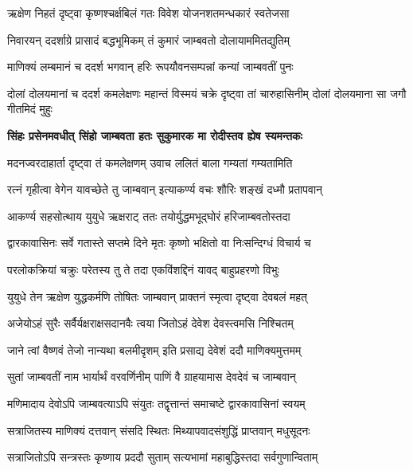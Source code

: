 \begin{center}
\twolineshloka
{ऋक्षेण निहतं दृष्ट्वा कृष्णश्चर्क्षबिलं गतः}
{विवेश योजनशतमन्धकारं स्वतेजसा}%

\twolineshloka
{निवारयन् ददर्शाग्रे प्रासादं बद्धभूमिकम्}
{तं कुमारं जाम्बवतो दोलायाममितद्युतिम्}%

\twolineshloka
{माणिक्यं लम्बमानं च ददर्श भगवान् हरिः}
{रूपयौवनसम्पन्नां कन्यां जाम्बवतीं पुनः}%

\threelineshloka
{दोलां दोलयमानां च ददर्श कमलेक्षणः}
{महान्तं विस्मयं चक्रे दृष्ट्वा तां चारुहासिनीम्}
{दोलां दोलयमाना सा जगौ गीतमिदं मुहुः}%

\begingroup
\bfseries
\twolineshloka
{सिंहः प्रसेनमवधीत् सिंहो जाम्बवता हतः}
{सुकुमारक मा रोदीस्तव ह्येष स्यमन्तकः}%
\endgroup

\twolineshloka
{मदनज्वरदाहार्ता दृष्ट्वा तं कमलेक्षणम्}
{उवाच ललितं बाला गम्यतां गम्यतामिति}%

\twolineshloka
{रत्नं गृहीत्वा वेगेन यावच्छेते तु जाम्बवान्}
{इत्याकर्ण्य वचः शौरिः शङ्खं दध्मौ प्रतापवान्}%

\twolineshloka
{आकर्ण्य सहसोत्थाय युयुधे ऋक्षराट् ततः}
{तयोर्युद्धमभूद्घोरं हरिजाम्बवतोस्तदा}%

\twolineshloka
{द्वारकावासिनः सर्वे गतास्ते सप्तमे दिने}
{मृतः कृष्णो भक्षितो वा निःसन्दिग्धं विचार्य च}%

\twolineshloka
{परलोकक्रियां चक्रुः परेतस्य तु ते तदा}
{एकविंशद्दिनं यावद् बाहुप्रहरणो विभुः}%

\twolineshloka
{युयुधे तेन ऋक्षेण युद्धकर्मणि तोषितः}
{जाम्बवान् प्राक्तनं स्मृत्वा दृष्ट्वा देवबलं महत्}%


\twolineshloka
{अजेयोऽहं सुरैः सर्वैर्यक्षराक्षसदानवैः}
{त्वया जितोऽहं देवेश देवस्त्वमसि निश्चितम्}%

\twolineshloka
{जाने त्वां वैष्णवं तेजो नान्यथा बलमीदृशम्}
{इति प्रसाद्य देवेशं ददौ माणिक्यमुत्तमम्}%

\twolineshloka
{सुतां जाम्बवतीं नाम भार्यार्थं वरवर्णिनीम्}
{पाणिं वै ग्राहयामास देवदेवं च जाम्बवान्}%

\twolineshloka
{मणिमादाय देवोऽपि जाम्बवत्याऽपि संयुतः}
{तद्वृत्तान्तं समाचष्टे द्वारकावासिनां स्वयम्}%

\twolineshloka
{सत्राजितस्य माणिक्यं दत्तवान् संसदि स्थितः}
{मिथ्यापवादसंशुद्धिं प्राप्तवान् मधुसूदनः}%

\twolineshloka
{सत्राजितोऽपि सन्त्रस्तः कृष्णाय प्रददौ सुताम्}
{सत्यभामां महाबुद्धिस्तदा सर्वगुणान्विताम्}%


\end{center}
